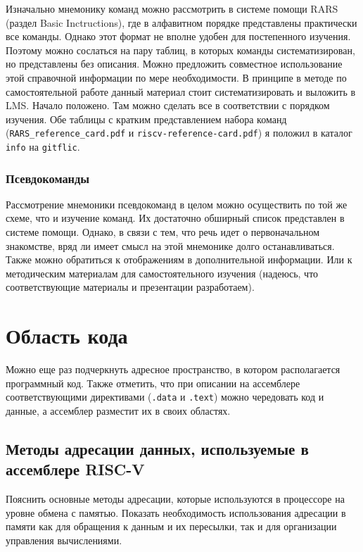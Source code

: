 Изначально мнемонику команд можно рассмотрить в системе помощи RARS (раздел Basic Inctructions), где в алфавитном порядке представлены практически все команды. Однако этот формат не вполне удобен для постепенного изучения. Поэтому можно сослаться на пару таблиц, в которых команды систематизирован, но представлены без описания. Можно предложить совместное использование этой справочной информации по мере необходимости. В принципе в методе по самостоятельной работе данный материал стоит систематизировать и выложить в LMS. Начало положено. Там можно сделать все в соответствии с порядком изучения.
Обе таблицы с кратким представлением набора команд (\verb|RARS_reference_card.pdf| и \verb|riscv-reference-card.pdf|) я положил в каталог \verb|info| на \verb|gitflic|.

\subsubsection{Псевдокоманды}

Рассмотрение мнемоники псевдокоманд в целом можно осуществить по той же схеме, что и изучение команд. Их достаточно обширный список представлен в системе помощи. Однако, в связи с тем, что речь идет о первоначальном знакомстве, вряд ли имеет смысл на этой мнемонике долго останавливаться. Также можно обратиться к отображениям в дополнительной информации. Или к методическим материалам для самостоятельного изучения (надеюсь, что соответствующие материалы и презентации разработаем).

\section{Область кода}

Можно еще раз подчеркнуть адресное пространство, в котором располагается программный код. Также отметить, что при описании на ассемблере соответствующими директивами (\verb|.data| и \verb|.text|) можно чередовать код и данные, а ассемблер разместит их в своих областях.

\subsection{Методы адресации данных, используемые в ассемблере RISC-V}

Пояснить основные методы адресации, которые используются в процессоре на уровне обмена с памятью. Показать необходимость использования адресации в памяти как для обращения к данным и их пересылки, так и для организации управления вычислениями.

